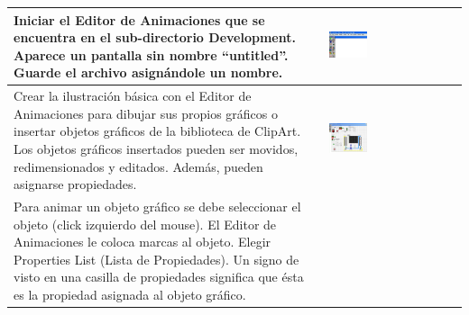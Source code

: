 \begin{table}[H]
\centering
\renewcommand*{\arraystretch}{0.01}
\begin{tabular}{*{2}{m{}}}
   \hline
	Iniciar el Editor de Animaciones que se encuentra en el sub-directorio 
	Development. Aparece un pantalla sin nombre ``untitled''. Guarde el
	archivo asignándole un nombre.
	&\begin{center}
	 \includegraphics[width=0.3\textwidth]
	{Cap5-SCADA/images/animEdit.jpeg}
	\end{center}\\
   \hline
    	Crear la ilustración básica con el Editor de Animaciones para  
	dibujar sus propios gráficos o insertar objetos gráficos de 
	la biblioteca de ClipArt. Los objetos gráficos insertados pueden ser 
	movidos, redimensionados y editados. Además, pueden asignarse 
	propiedades.
	&\begin{center}
	   \includegraphics[width=0.3\textwidth]
	{Cap5-SCADA/images/animEdit1.jpeg}
	\end{center}\\
   \hline
	  Para animar un objeto gráfico se debe seleccionar 
	  el objeto (click izquierdo del mouse). El Editor de Animaciones le 
	  coloca marcas al objeto. Elegir Properties List (Lista de 
	  Propiedades). Un signo de visto en una casilla de propiedades 
	  significa que ésta es la propiedad asignada al objeto gráfico. 
	&\begin{center}
	   \includegraphics[width=0.4\textwidth]

\end{center}
\end{tabular}
\end{table}
